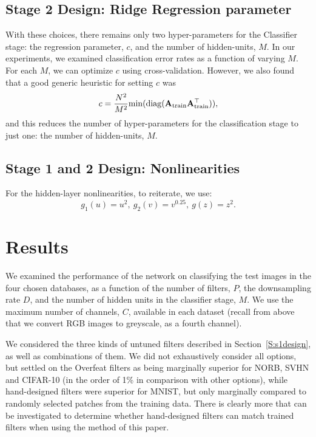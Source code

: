 \documentclass[conference]{IEEEtran}
\begin{document}
\subsection{Stage 2 Design: Ridge Regression parameter}

With these choices, there remains only two hyper-parameters for the Classifier stage: the regression parameter, $c$, and the number of hidden-units, $M$. In our experiments, we examined classification error rates as a function of varying $M$. For each $M$, we can optimize $c$ using cross-validation. However, we also found that a good generic heuristic for setting $c$ was
\begin{equation}
c = \frac{N^2}{M^2}{\rm min}({\rm diag}({\bf A}_{\rm train}{\bf A}_{\rm train}^{\top})),
\end{equation} 
and this reduces the number of hyper-parameters for the classification stage to just one: the number of hidden-units, $M$.

\subsection{Stage 1 and 2 Design: Nonlinearities}

For the hidden-layer nonlinearities, to reiterate, we use:
\begin{equation}\label{nonlin}
g_1(u) = u^2,~g_2(v) = v^{0.25},~g(z) = z^2.
\end{equation}



\section{Results}\label{S:4}

We examined the performance of the network on classifying the test images in the four chosen databases, as a function of the number of filters, $P$, the downsampling rate $D$, and the number of hidden units in the classifier stage, $M$. We use the maximum number of channels, $C$, available in each dataset (recall from above that we convert RGB images to greyscale, as a fourth channel). 

We considered the three kinds of untuned filters described in Section~\ref{S:s1design}, as well as combinations of them. We did not exhaustively consider all options, but settled on the Overfeat filters as being marginally superior for NORB, SVHN and CIFAR-10 (in the order of 1\% in comparison with other options), while hand-designed filters were superior for MNIST, but only marginally compared to randomly selected patches from the training data. There is clearly more that can be investigated to determine whether hand-designed filters can match trained filters when using the method of this paper.
\end{document}
